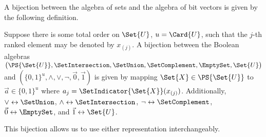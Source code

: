 \documentclass[../main.tex]{subfiles}
\begin{document}
A bijection between the algebra of sets and the algebra of bit vectors is given by the following definition.
\begin{definition}
\label{def:bijection}
Suppose there is some total order on $\Set{U}$, $u=\Card{U}$, such that the $j$-th ranked element may be denoted by $x_{(j)}$. A bijection between the Boolean algebras $\left(\PS{\Set{U}},\SetIntersection,\SetUnion,\SetComplement,\EmptySet,\Set{U}\right)$ and $(\{0,1\}^u,\land,\lor,\neg,\vec{0},\vec{1})$ is given by mapping
$\Set{X} \in \PS{\Set{U}}$ to $\vec{a} \in \{0,1\}^u$ where $a_j = \SetIndicator{\Set{X}}(x_{(j)})$.
Additionally, $\lor \leftrightarrow \SetUnion$, $\land \leftrightarrow \SetIntersection$, $\neg \leftrightarrow \SetComplement$, $\vec{0} \leftrightarrow \EmptySet$, and $\vec{1} \leftrightarrow \Set{U}$.
\end{definition}
This bijection allows us to use either representation interchangeably.
\end{document}
